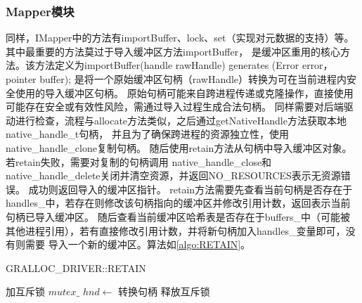 \subsubsection{Mapper模块}
同样，IMapper中的方法有importBuffer、lock、set（实现对元数据的支持）等。其中最重要的方法莫过于导入缓冲区方法importBuffer，
是缓冲区重用的核心方法。该方法定义为importBuffer(handle rawHandle) generates (Error error， pointer buffer);
是将一个原始缓冲区句柄（rawHandle）转换为可在当前进程内安全使用的导入缓冲区句柄。
原始句柄可能来自跨进程传递或克隆操作，直接使用可能存在安全或有效性风险，需通过导入过程生成合法句柄。
同样需要对后端驱动进行检查，流程与allocate方法类似，之后通过getNativeHandle方法获取本地native\_handle\_t句柄，
并且为了确保跨进程的资源独立性，使用native\_handle\_clone复制句柄。
随后使用retain方法从句柄中导入缓冲区对象。若retain失败，需要对复制的句柄调用
native\_handle\_close和native\_handle\_delete关闭并清空资源，并返回NO\_RESOURCES表示无资源错误。
成功则返回导入的缓冲区指针。
retain方法需要先查看当前句柄是否存在于handles\_中，若存在则修改该句柄指向的缓冲区并修改引用计数，返回表示当前句柄已导入缓冲区。
随后查看当前缓冲区哈希表是否存在于buffers\_中（可能被其他进程引用），若有直接修改引用计数，并将新句柄加入handles\_变量即可，没有则需要
导入一个新的缓冲区。算法如\ref{algo:RETAIN}。


\begin{algorithm}
\caption{GRALLOC\_DRIVER::RETAIN}
\label{algo:RETAIN}
\SetAlgoLined
{}
\BlankLine
加互斥锁 $mutex\_$\;
$hnd \leftarrow$ 转换句柄\;
释放互斥锁\;
\end{algorithm}

